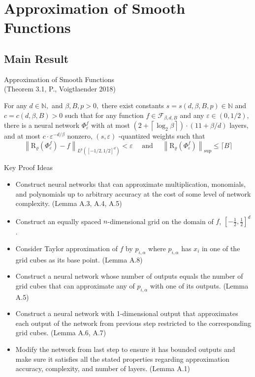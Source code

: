 \documentclass{if-beamer}
\begin{document}
\section{Approximation of Smooth Functions}
\subsection{Main Result}
\begin{frame}{Approximation of Smooth Functions \\(Theorem 3.1, P., Voigtlaender 2018)}
    \begin{tcolorbox}
        For any $d \in \mathbb{N},$ and $\beta, B, p>0,$ there exist constants $s=s(d, \beta, B, p) \in \mathbb{N}$ and $c=c(d, \beta, B)>0$ such that for any function $f \in \mathcal{F}_{\beta, d, B}$ and any $\varepsilon \in(0,1 / 2),$ there is a neural network $\Phi_{\varepsilon}^{f}$ with at most $\left(2+\left\lceil\log _{2} \beta\right\rceil\right) \cdot(11+\beta / d)$ layers, and at most $c \cdot \varepsilon^{-d / \beta}$ nonzero, $(s, \varepsilon)$ -quantized weights such that {\small
        \[
        \left\|\mathrm{R}_{\varrho}\left(\Phi_{\varepsilon}^{f}\right)-f\right\|_{L^{p}\left([-1 / 2,1 / 2]^{d}\right)}<\varepsilon \quad \text { and } \quad\left\|\mathrm{R}_{\varrho}\left(\Phi_{\varepsilon}^{f}\right)\right\|_{\mathrm{sup}} \leq\lceil B\rceil
        \]
        }
    \end{tcolorbox}
\end{frame}

\begin{frame}{Key Proof Ideas}
    \begin{itemize}
        \item Construct neural networks that can approximate multiplication, monomials, and polynomials up to arbitrary accuracy at the cost of some level of network complexity. (Lemma A.3, A.4, A.5)
        \item Construct an equally spaced $n$-dimensional grid on the domain of $f$, $[-\frac{1}{2}, \frac{1}{2}]^d$.
        \item Consider Taylor approximation of $f$ by $p_{i,\alpha}$ where $p_{i,\alpha}$ has $x_i$ in one of the grid cubes as its base point. (Lemma A.8)
        \item Construct a neural network whose number of outputs equals the number of grid cubes that can approximate any of $p_{i,\alpha}$ with one of its outputs. (Lemma A.5)
        \item Construct a neural network with 1-dimensional output that approximates each output of the network from previous step restricted to the corresponding grid cubes. (Lemma A.6, A.7)
        \item Modify the network from last step to ensure it has bounded outputs and make sure it satisfies all the stated properties regarding approximation accuracy, complexity, and number of layers. (Lemma A.1)
    \end{itemize}
\end{frame}
\end{document}
